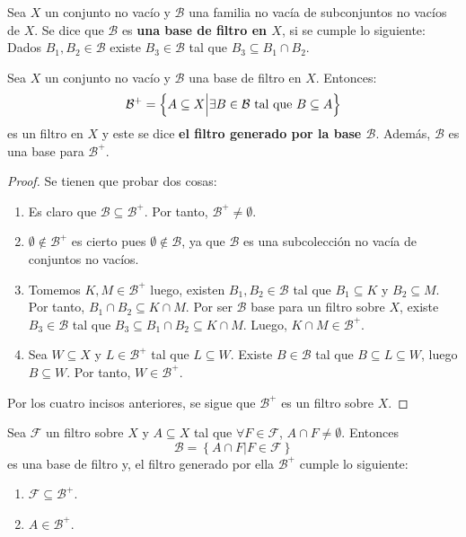 \documentclass[12pt]{report}
\theoremstyle{largebreak}
\begin{document}
    \begin{mydef}
        Sea $X$ un conjunto no vacío y $\mathcal{B}$ una familia no vacía de subconjuntos no vacíos de $X$. Se dice que $\mathcal{B}$ es \textbf{una base de filtro en $X$}, si se cumple lo siguiente: Dados $B_1,B_2\in\mathcal{B}$ existe $B_3\in\mathcal{B}$ tal que $B_3\subseteq B_1\cap B_2$. 
    \end{mydef}

    \begin{propo}
        Sea $X$ un conjunto no vacío y $\mathcal{B}$ una base de filtro en $X$. Entonces:
        \begin{equation*}
            \mathcal{B}^+=\left\{A\subseteq X\Big|\exists B\in\mathcal{B}\textup{ tal que }B\subseteq A \right\}
        \end{equation*}
        es un filtro en $X$ y este se dice \textbf{el filtro generado por la base $\mathcal{B}$}. Además, $\mathcal{B}$ es una base para $\mathcal{B}^+$.
    \end{propo}

    \begin{proof}
        Se tienen que probar dos cosas:
        \begin{enumerate}
            \item Es claro que $\mathcal{B}\subseteq\mathcal{B}^+$. Por tanto, $\mathcal{B}^+\neq\emptyset$.
            \item $\emptyset\notin\mathcal{B}^+$ es cierto pues $\emptyset\notin\mathcal{B}$, ya que $\mathcal{B}$ es una subcolección no vacía de conjuntos no vacíos.
            \item Tomemos $K,M\in\mathcal{B}^+$ luego, existen $B_1,B_2\in\mathcal{B}$ tal que $B_1\subseteq K$ y $B_2\subseteq M$. Por tanto, $B_1\cap B_2\subseteq K\cap M$. Por ser $\mathcal{B}$ base para un filtro sobre $X$, existe $B_3\in\mathcal{B}$ tal que $B_3\subseteq B_1\cap B_2\subseteq K\cap M$. Luego, $K\cap M\in\mathcal{B}^+$.
            \item Sea $W\subseteq X$ y $L\in\mathcal{B}^+$ tal que $L\subseteq W$. Existe $B\in\mathcal{B}$ tal que $B\subseteq L\subseteq W$, luego $B\subseteq W$. Por tanto, $W\in\mathcal{B}^+$.
        \end{enumerate}
        Por los cuatro incisos anteriores, se sigue que $\mathcal{B}^+$ es un filtro sobre $X$.
    \end{proof}

    \begin{propo}
        Sea $\mathcal{F}$ un filtro sobre $X$ y $A\subseteq X$ tal que $\forall F\in\mathcal{F}$, $A\cap F\neq\emptyset$. Entonces
        \begin{equation*}
            \mathcal{B}=\left\{A\cap F\Big|F\in\mathcal{F} \right\}
        \end{equation*}
        es una base de filtro y, el filtro generado por ella $\mathcal{B}^+$ cumple lo siguiente:
        \begin{enumerate}
            \item $\mathcal{F}\subseteq\mathcal{B}^+$.
            \item $A\in\mathcal{B}^+$.
        \end{enumerate}
    \end{propo}
\end{document}
